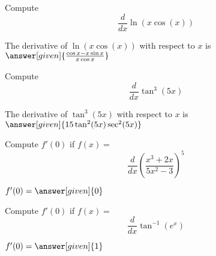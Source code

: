 \documentclass{ximera}
\begin{document}
\begin{question} %
  Compute
  \[
  \frac{d}{dx} \ln(x\cos (x))
  \]
  
    
		The derivative of $\ln(x\cos (x))$ with respect to $x$ is
		 $\answer[given]{\frac{\cos x - x\sin x}{x\cos x}}$
		
\end{question}

\begin{question} %
  Compute
  \[
  \frac{d}{dx} \tan^3(5x)
  \]
  
   
		The derivative of $\tan^3(5x)$ with respect to $x$ is
		 $\answer[given]{15\tan^2(5x)\sec^2(5x)}$
		
\end{question}

\begin{question} %
  Compute $f'(0)$ if $f(x)=$
  \[
  \frac{d}{dx} \left(\frac{x^3 + 2x}{5x^2 -3}\right)^5
  \]
  
 
		 $f'(0) = \answer[given]{0}$
		
\end{question}

\begin{question} %
  Compute $f'(0)$ if $f(x)=$
  \[
  \frac{d}{dx} \tan^{-1}(e^x)
  \]
  
 
		 $f'(0) = \answer[given]{1}$
		
\end{question}
\end{document}
